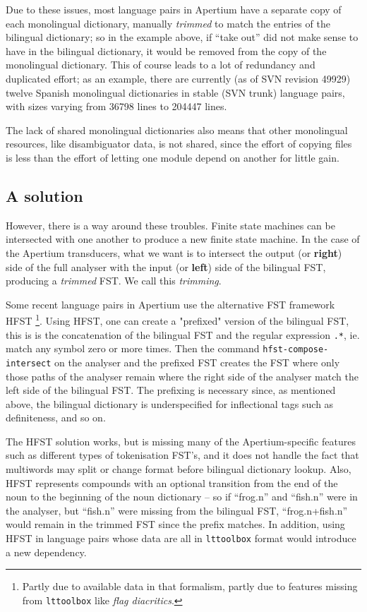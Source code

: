\documentclass[11pt]{article}
\begin{document}
Due to these issues, most language pairs in Apertium have a separate
copy of each monolingual dictionary, manually \emph{trimmed} to match
the entries of the bilingual dictionary; so in the example above, if
``take out'' did not make sense to have in the bilingual dictionary,
it would be removed from the copy of the monolingual dictionary. This
of course leads to a lot of redundancy and duplicated effort; as an
example, there are currently (as of SVN revision 49929) twelve Spanish
monolingual dictionaries in stable (SVN trunk) language pairs, with
sizes varying from 36798 lines to 204447 lines.

The lack of shared monolingual dictionaries also means that other
monolingual resources, like disambiguator data, is not shared, since
the effort of copying files is less than the effort of letting one
module depend on another for little gain.

\subsection{A solution}

However, there is a way around these troubles. Finite state machines
can be intersected with one another to produce a new finite state
machine. In the case of the Apertium transducers, what we want is to
intersect the output (or \textbf{right}) side of the full analyser
with the input (or \textbf{left}) side of the bilingual FST, producing
a \emph{trimmed} FST. We call this \emph{trimming}.

Some recent language pairs in Apertium use the alternative FST
framework HFST \citep{linden2011hfst}\footnote{Partly due to available
data in that formalism, partly due to features missing from
\texttt{lttoolbox} like \emph{flag diacritics}.}. Using HFST, one can
create a "prefixed" version of the bilingual FST, this is is the
concatenation of the bilingual FST and the regular expression
\texttt{.*}, ie. match any symbol zero or more times. Then the command
\texttt{hfst-compose-intersect} on the analyser and the prefixed FST
creates the FST where only those paths of the analyser remain where
the right side of the analyser match the left side of the bilingual
FST. The prefixing is necessary since, as mentioned above, the
bilingual dictionary is underspecified for inflectional tags such as
definiteness, and so on.

The HFST solution works, but is missing many of the Apertium-specific
features such as different types of tokenisation FST's, and it does
not handle the fact that multiwords may split or change format before
bilingual dictionary lookup. Also, HFST represents compounds with an
optional transition from the end of the noun to the beginning of the
noun dictionary -- so if ``frog.n'' and ``fish.n'' were in the
analyser, but ``fish.n'' were missing from the bilingual FST,
``frog.n+fish.n'' would remain in the trimmed FST since the prefix
matches.  In addition, using HFST in language pairs whose data are all
in \texttt{lttoolbox} format would introduce a new dependency.
\end{document}
